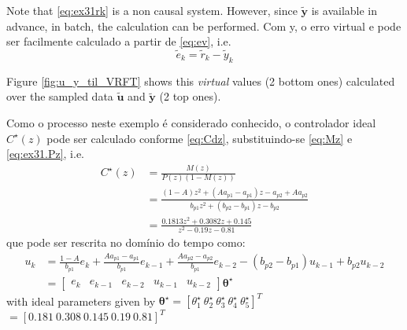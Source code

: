 \begin{exmp}
   Note that \eqref{eq:ex31rk} is a non causal system.
   However, since $\tilde{\bm{y}}$ is available in advance, in batch, the calculation can be performed.
   Com y, o erro virtual e pode ser facilmente calculado a partir de \eqref{eq:ev}, i.e.
   \begin{equation*}
      \tilde{e}_k = \tilde{r}_k - \tilde{y}_k 
   \end{equation*}

   Figure \ref{fig:u_y_til_VRFT} shows this \textit{virtual} values (2 bottom ones) calculated over the sampled data $\tilde{\bm{u}}$ and $\tilde{\bm{y}}$ (2 top ones).

   Como o processo neste exemplo é considerado conhecido, o controlador ideal $C^\star(z)$ pode ser calculado conforme \eqref{eq:Cdz}, substituindo-se \eqref{eq:Mz} e \eqref{eq:ex31.Pz}, i.e.
   \begin{align}
      C^\star(z) &= \frac{M(z)}{P(z)\left(1-M(z)\right)} \\
             &= \frac{(1 - A)z^2 + (Aa_{p1} - a_{p1})z - a_{p2} + Aa_{p2}}{b_{p1}z^2 + (b_{p2} - b_{p1})z - b_{p2}} \\
             &= \frac{0.1813 z^2 + 0.3082 z + 0.145}{ z^2 - 0.19 z - 0.81}
   \end{align}
   que pode ser rescrita no domínio do tempo como:
   \begin{align}
      \label{eq:emp31uk}
      u_k &= \frac{1 - A}{b_{p1}}e_k + \frac{Aa_{p1} - a_{p1}}{b_{p1}}e_{k-1} + \frac{Aa_{p2} - a_{p2}}{b_{p1}}e_{k-2} - (b_{p2} - b_{p1})u_{k-1} + b_{p2}u_{k-2} \nonumber\\
          &=\begin{bmatrix} e_k & e_{k-1} & e_{k-2} & u_{k-1} & u_{k-2} \end{bmatrix}  \bm{\theta}^\star
   \end{align}
   with ideal parameters given by $\bm{\theta}^\star = [\theta^\star_1 \ \theta^\star_2 \ \theta^\star_3 \ \theta^\star_4 \ \theta^\star_5]^T$ $ = [0.181 \ 0.308 \  0.145 \  0.19 \ 0.81]^T $
   




\end{exmp}

